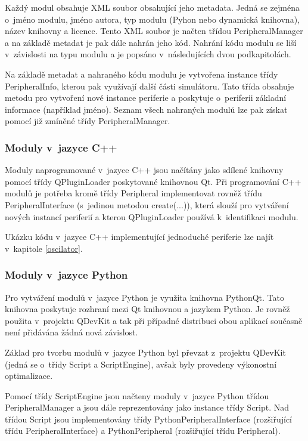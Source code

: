 Každý modul obsahuje XML soubor obsahující jeho metadata. Jedná se zejména o~jméno modulu, jméno autora, typ modulu (Pyhon nebo dynamická knihovna), název knihovny a licence. Tento XML soubor je načten třídou PeripheralManager a na základě metadat je pak dále nahrán jeho kód. Nahrání kódu modulu se liší v~závislosti na typu modulu a je popsáno v~následujících dvou podkapitolách.

Na základě metadat a nahraného kódu modulu je vytvořena instance třídy PeripheralInfo, kterou pak využívají další části simulátoru. Tato třída obsahuje metodu pro vytvoření nové instance periferie a poskytuje o~periferii základní informace (například jméno). Seznam všech nahraných modulů lze pak získat pomocí již zmíněné třídy PeripheralManager.

\subsubsection{Moduly v~jazyce C++}

Moduly naprogramované v~jazyce C++ jsou načítány jako sdílené knihovny pomocí třídy QPluginLoader poskytované knihovnou Qt. Při programování C++ modulů je potřeba kromě třídy Peripheral implementovat rovněž třídu PeripheralInterface (s~jedinou metodou create(...)), která slouží pro vytváření nových instancí periferií a kterou QPluginLoader používá k~identifikaci modulu.

Ukázku kódu v~jazyce C++ implementující jednoduché periferie lze najít v~kapitole \ref{oscilator}.

\subsubsection{Moduly v~jazyce Python}

Pro vytváření modulů v~jazyce Python je využita knihovna PythonQt. Tato knihovna poskytuje rozhraní mezi Qt knihovnou a jazykem Python. Je rovněž použita v~projektu QDevKit a tak při případné distribuci obou aplikací současně není přidávána žádná nová závislost.

Základ pro tvorbu modulů v~jazyce Python byl převzat z~projektu QDevKit (jedná se o~třídy Script a ScriptEngine), avšak byly provedeny výkonostní optimalizace.

Pomocí třídy ScriptEngine jsou načteny moduly v~jazyce Python třídou PeripheralManager a jsou dále reprezentovány jako instance třídy Script. Nad třídou Script jsou implementovány třídy PythonPeripheralInterface (rozšiřující třídu PeripheralInterface) a PythonPeripheral (rozšiřující třídu Peripheral).

